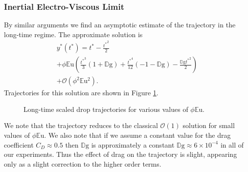 \documentclass[aip,reprint, floatfix]{revtex4-1}
\begin{document}
\subsubsection{Inertial Electro-Viscous Limit}
By similar arguments we find an asymptotic estimate of the trajectory in the long-time regime. The approximate solution is 
\begin{gather}
{y^*}({t^*}) = {t^*} - \frac{{t^*}^{2}}{2}  \nonumber \\
+ \phi\mathbb{E}\mbox{u} \left(\frac{{t^*}^{3}}{3} \left(1 + \mathbb{D}\mbox{g}\right) + \frac{{t^*}^{4}}{12} \left(-1 - \mathbb{D}\mbox{g}\right) - \frac{\mathbb{D}\mbox{g} {t^*}^{2}}{2}\right) \nonumber \\
 + \mathcal{O}(\phi^2 \mathbb{E}\mbox{u}^2).
\label{perturb_viscous}
\end{gather}
Trajectories for this solution are shown in Figure \ref{fig:long_times}.
\begin{figure}[htb]
    \centering
    \resizebox{0.5\textwidth}{!}{}
    \caption{Long-time scaled drop trajectories for various values of $\phi \mathbb{E}\mbox{u}$.}
     \label{fig:long_times}
\end{figure}
We note that the trajectory reduces to the classical $\mathcal{O}(1)$ solution for small values of $\phi \mathbb{E}\mbox{u}$. We also note that if we assume a constant value for the drag coefficient $C_D \approx 0.5$ then $\mathbb{D}\mbox{g}$ is approximately a constant $\mathbb{D}\mbox{g} \approx 6 \times 10^{-4}$ in all of our experiments. Thus the effect of drag on the trajectory is slight, appearing only as a slight correction to the higher order terms.
 
\end{document}
